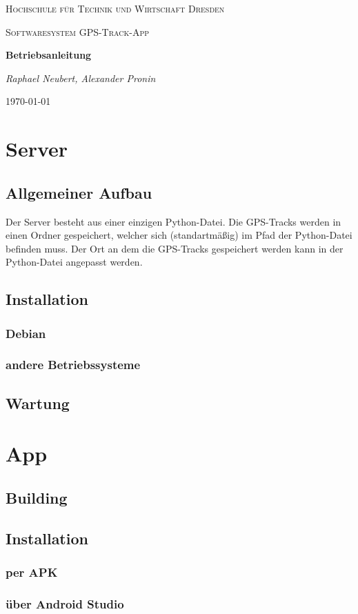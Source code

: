 \documentclass{article}
\begin{document}
\begin{titlepage}
    \centering
    {\scshape\LARGE Hochschule für Technik und Wirtschaft Dresden \par}
    \vspace{1cm}
    {\scshape\Large Softwaresystem \glqq GPS-Track-App\grqq\par}
    \vspace{1.5cm}
    {\huge\bfseries Betriebsanleitung\par}
    \vspace{2cm}
    {\Large\itshape Raphael Neubert, Alexander Pronin \par}
    \vfill

    {\large \today\par}
\end{titlepage}

\tableofcontents
\newpage

\section{Server}
\subsection{Allgemeiner Aufbau}
Der Server besteht aus einer einzigen Python-Datei.
Die GPS-Tracks werden in einen Ordner  gespeichert,
welcher sich (standartmäßig) im Pfad der Python-Datei befinden muss.
Der Ort an dem die GPS-Tracks gespeichert werden kann in der Python-Datei
angepasst werden.
\subsection{Installation}
\subsubsection{Debian}
\subsubsection{andere Betriebssysteme}
\subsection{Wartung}
\section{App}
\subsection{Building}
\subsection{Installation}
\subsubsection{per APK}
\subsubsection{über Android Studio}
\end{document}
